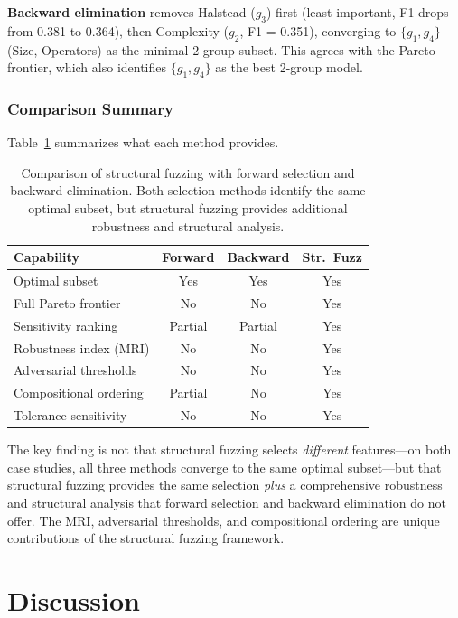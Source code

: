 \documentclass[manuscript,review,anonymous]{acmart}
\begin{document}
\textbf{Backward elimination} removes Halstead ($g_3$) first (least important, F1 drops from 0.381 to 0.364), then Complexity ($g_2$, F1 = 0.351), converging to $\{g_1, g_4\}$ (Size, Operators) as the minimal 2-group subset.
This agrees with the Pareto frontier, which also identifies $\{g_1, g_4\}$ as the best 2-group model.

\subsubsection{Comparison Summary}

Table~\ref{tab:baselines} summarizes what each method provides.

\begin{table}[t]
\centering
\caption{Comparison of structural fuzzing with forward selection and backward elimination. Both selection methods identify the same optimal subset, but structural fuzzing provides additional robustness and structural analysis.}
\label{tab:baselines}
\small
\begin{tabular}{@{}lccc@{}}
\toprule
\textbf{Capability} & \textbf{Forward} & \textbf{Backward} & \textbf{Str.\ Fuzz} \\
\midrule
Optimal subset & Yes & Yes & Yes \\
Full Pareto frontier & No & No & Yes \\
Sensitivity ranking & Partial & Partial & Yes \\
Robustness index (MRI) & No & No & Yes \\
Adversarial thresholds & No & No & Yes \\
Compositional ordering & Partial & No & Yes \\
Tolerance sensitivity & No & No & Yes \\
\bottomrule
\end{tabular}
\end{table}

The key finding is not that structural fuzzing selects \emph{different} features---on both case studies, all three methods converge to the same optimal subset---but that structural fuzzing provides the same selection \emph{plus} a comprehensive robustness and structural analysis that forward selection and backward elimination do not offer.
The MRI, adversarial thresholds, and compositional ordering are unique contributions of the structural fuzzing framework.


\section{Discussion}
\label{sec:discussion}
\end{document}
